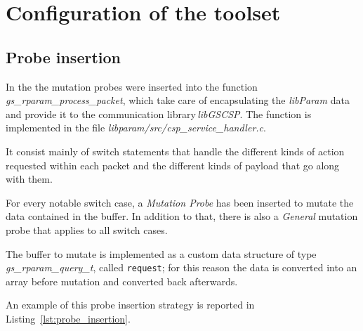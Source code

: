 
\chapter{Configuration of the toolset}

\section{Probe insertion}

In the \case the mutation probes were inserted into the function \emph{gs\_rparam\_process\_packet}, which take care of encapsulating the \emph{libParam} data and provide it to the communication library \emph{libGSCSP}. The function is implemented in the file \emph{libparam/src/csp\_service\_handler.c}.

It consist mainly of switch statements that handle the different kinds of action requested within each packet and the different kinds of payload that go along with them.

For every notable switch case, a \emph{Mutation Probe} has been inserted to mutate the data contained in the buffer. In addition to that, there is also a \emph{General} mutation probe that applies to all switch cases.

The buffer to mutate is implemented as a custom data structure of type \emph{gs\_rparam\_query\_t}, called \texttt{request}; for this reason the data is converted into an array before mutation and converted back afterwards.

An example of this probe insertion strategy is reported in Listing~\ref{lst:probe_insertion}.

